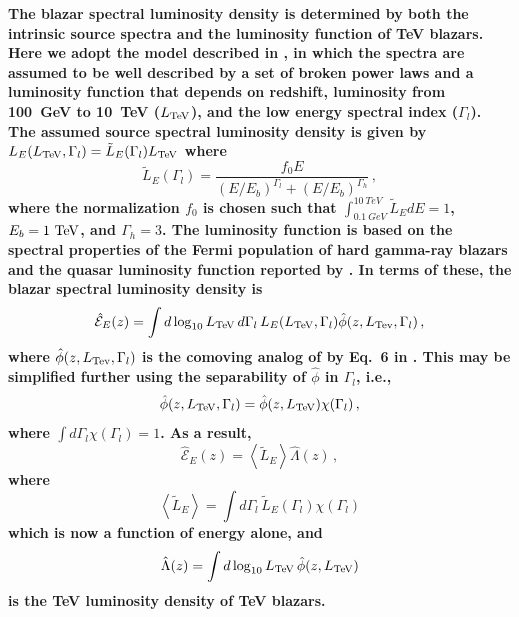 \documentclass[numberedappendix]{emulateapj}
\newcommand\Ac[1]{{\color{green} \bf #1}} %
\begin{document}
\Ac{
The blazar spectral luminosity density is determined by both the
intrinsic source spectra and the luminosity function of TeV blazars.
Here we adopt the model described in \citet{2014ApJ...790..137B}, in
which the spectra are assumed to be well described by a set of broken
power laws and a luminosity function that depends on redshift,
luminosity from 100~GeV to 10~TeV ($L_{\rm TeV}$), and the low energy
spectral index ($\Gamma_l$).  The assumed source spectral luminosity
density is given by 
$L_E(L_{\rm TeV},\Gamma_l)=\tilde{L}_E(\Gamma_l) L_{\rm TeV}$ where
\begin{equation}
\label{eq:intrinsic_spectrum}
\tilde{L}_E(\Gamma_l) = \frac{f_0 E}{(E/E_b)^{\Gamma_l} + (E/E_b)^{\Gamma_h}}\,,
\end{equation}
where the normalization $f_0$ is chosen such that 
$\int_{0.1~GeV}^{10~TeV} \tilde{L}_E dE = 1$, $E_b=1~{\rm TeV}$, and
$\Gamma_h=3$.  The luminosity function is based on the spectral
properties of the Fermi population of hard gamma-ray blazars and the
quasar luminosity function reported by \citet{2007ApJ...654..731H}.
In terms of these, the blazar spectral luminosity density is
\begin{equation}\label{eq:spec_lum_dens}
\hat{\mathcal{E}}_E(z)
=
\int d\log_{10}L_{\rm TeV}\,d\Gamma_l\, L_E(L_{\rm TeV},\Gamma_l)
\hat{\phi}(z,L_{\rm Tev},\Gamma_l)\,,
\end{equation}
where $\hat{\phi}(z,L_{\rm Tev},\Gamma_l)$ is the comoving analog of
by Eq.~6 in \citet{2014ApJ...790..137B}.  This may be simplified
further using the separability of $\hat{\phi}$ in $\Gamma_l$, i.e.,
\begin{equation}
\hat{\phi}(z,L_{\rm TeV},\Gamma_l)
=
\hat{\phi}(z,L_{\rm TeV})
\chi(\Gamma_l)\,,
\end{equation}
where $\int d\Gamma_l \chi(\Gamma_l) = 1$.  As a result,
\begin{equation}
\label{eq:mean_heat}
\hat{\mathcal{E}}_E(z)
=
\left< \tilde{L}_E \right>
\hat{\Lambda}(z)\,,
\end{equation}
where
\begin{equation}
\left< \tilde{L}_E \right>
=
\int d\Gamma_l\,\tilde{L}_E(\Gamma_l) \chi(\Gamma_l)
\end{equation}
which is now a function of energy alone, and
\begin{equation}
\hat{\Lambda}(z) = 
\int d\log_{10}L_{\rm TeV}\,\hat{\phi}(z,L_{\rm TeV})
\end{equation}
is the TeV luminosity density of TeV blazars.  

}
\end{document}
